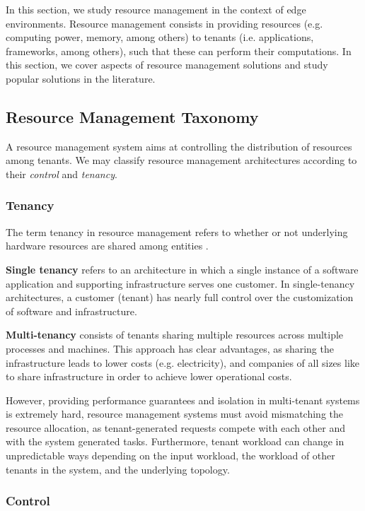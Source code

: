
In this section, we study resource management in the context of edge environments. Resource management consists in providing resources (e.g. computing power, memory, among others) to tenants (i.e. applications, frameworks, among others), such that these can perform their computations. In this section, we cover aspects of resource management solutions and study popular solutions in the literature.

\subsection{Resource Management Taxonomy}

A resource management system aims at controlling the distribution of resources among tenants. We may classify resource management architectures according to their \textit{control} and \textit{tenancy}.

\subsubsection{Tenancy}

The term tenancy in resource management refers to whether or not underlying hardware resources are shared among entities \cite{Hong2019}.

\textbf{Single tenancy} refers to an architecture in which a single instance of a software application and supporting infrastructure serves one customer. In single-tenancy architectures, a customer (tenant) has nearly full control over the customization of software and infrastructure.

\textbf{Multi-tenancy} consists of tenants sharing multiple resources across multiple processes and machines. This approach has clear advantages, as sharing the infrastructure leads to lower costs (e.g. electricity), and companies of all sizes like to share infrastructure in order to achieve lower operational costs.

However, providing performance guarantees and isolation in multi-tenant systems is extremely hard, resource management systems must avoid mismatching the resource allocation, as tenant-generated requests compete with each other and with the system generated tasks. Furthermore, tenant workload can change in unpredictable ways depending on the input workload, the workload of other tenants in the system, and the underlying topology.

\subsubsection{Control}

